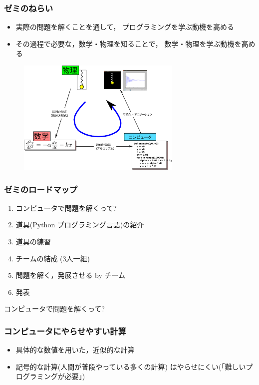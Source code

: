 \documentclass[12pt,dvipdfmx]{beamer}
\begin{document}
\begin{frame}
\frametitle{ゼミのねらい}
\begin{itemize}
\item 実際の問題を解くことを通して，
  プログラミングを学ぶ動機を高める
\item その過程で必要な，数学・物理を知ることで，
  数学・物理を学ぶ動機を高める
\end{itemize}

% 

\begin{figure}[htbp]
  \centering
\includegraphics[width=0.7\textwidth]{out/pdf/svg/math_phys_prog_3.pdf}
\end{figure}

\end{frame}

\begin{frame}
\frametitle{ゼミのロードマップ}
\begin{enumerate}
\item コンピュータで問題を解くって?
\item 道具(Python プログラミング言語)の紹介
\item 道具の練習
\item チームの結成 (3人一組)
\item 問題を解く，発展させる by チーム
\item 発表
\end{enumerate}
\end{frame}

\begin{frame}

コンピュータで問題を解くって?

\end{frame}


\begin{frame}
\frametitle{コンピュータにやらせやすい計算}
\begin{itemize}
\item 具体的な数値を用いた，近似的な計算
\item 記号的な計算(人間が普段やっている多くの計算)
はやらせにくい(「難しいプログラミングが必要」)
\end{itemize}
\end{frame}
\end{document}
